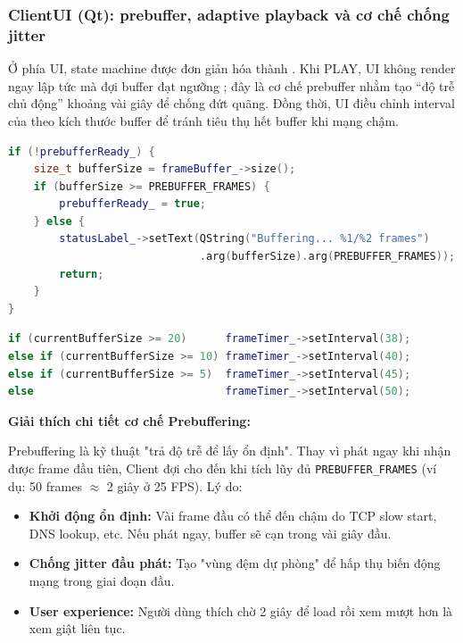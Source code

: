 \subsubsection{ClientUI (Qt): prebuffer, adaptive playback và cơ chế chống jitter}

Ở phía UI, state machine được đơn giản hóa thành . Khi PLAY, UI không render ngay lập tức mà đợi buffer đạt ngưỡng ; đây là cơ chế prebuffer nhằm tạo ``độ trễ chủ động'' khoảng vài giây để chống đứt quãng. Đồng thời, UI điều chỉnh interval của  theo kích thước buffer để tránh tiêu thụ hết buffer khi mạng chậm.

\begin{lstlisting}[language=C++, caption={Prebuffer: chỉ phát khi buffer đủ \texttt{PREBUFFER\_FRAMES}}, label={lst:ui_prebuffer}]
if (!prebufferReady_) {
    size_t bufferSize = frameBuffer_->size();
    if (bufferSize >= PREBUFFER_FRAMES) {
        prebufferReady_ = true;
    } else {
        statusLabel_->setText(QString("Buffering... %1/%2 frames")
                              .arg(bufferSize).arg(PREBUFFER_FRAMES));
        return;
    }
}
\end{lstlisting}

\begin{lstlisting}[language=C++, caption={Adaptive timer: tăng interval khi buffer thấp để giảm giật}, label={lst:ui_adaptive_timer}]
if (currentBufferSize >= 20)      frameTimer_->setInterval(38);
else if (currentBufferSize >= 10) frameTimer_->setInterval(40);
else if (currentBufferSize >= 5)  frameTimer_->setInterval(45);
else                              frameTimer_->setInterval(50);
\end{lstlisting}

\textbf{Giải thích chi tiết cơ chế Prebuffering:}

Prebuffering là kỹ thuật "trả độ trễ để lấy ổn định". Thay vì phát ngay khi nhận được frame đầu tiên, Client đợi cho đến khi tích lũy đủ \texttt{PREBUFFER\_FRAMES} (ví dụ: 50 frames $\approx$ 2 giây ở 25 FPS). Lý do:

\begin{itemize}
\item \textbf{Khởi động ổn định:} Vài frame đầu có thể đến chậm do TCP slow start, DNS lookup, etc. Nếu phát ngay, buffer sẽ cạn trong vài giây đầu.
\item \textbf{Chống jitter đầu phát:} Tạo "vùng đệm dự phòng" để hấp thụ biến động mạng trong giai đoạn đầu.
\item \textbf{User experience:} Người dùng thích chờ 2 giây để load rồi xem mượt hơn là xem giật liên tục.
\end{itemize}

